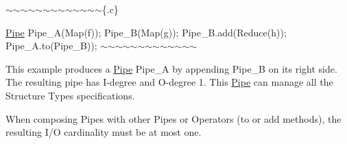 $\sim$$\sim$$\sim$$\sim$$\sim$$\sim$$\sim$$\sim$$\sim$$\sim$$\sim$$\sim$$\sim$\{.c\}

\hyperlink{class_pipe}{\-Pipe} \-Pipe\-\_\-\-A(\-Map(f)); \-Pipe\-\_\-\-B(\-Map(g)); \-Pipe\-\_\-\-B.\-add(\-Reduce(h)); \-Pipe\-\_\-\-A.\-to(\-Pipe\-\_\-\-B)); $\sim$$\sim$$\sim$$\sim$$\sim$$\sim$$\sim$$\sim$$\sim$$\sim$$\sim$$\sim$$\sim$

\-This example produces a \hyperlink{class_pipe}{\-Pipe} \-Pipe\-\_\-\-A by appending \-Pipe\-\_\-\-B on its right side. \-The resulting pipe has \-I-\/degree and \-O-\/degree 1. \-This \hyperlink{class_pipe}{\-Pipe} can manage all the \-Structure \-Types specifications.

\-When composing \-Pipes with other \-Pipes or \-Operators (to or add methods), the resulting \-I/\-O cardinality must be at most one. 

